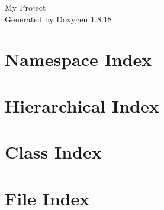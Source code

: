 \let\mypdfximage\pdfximage\def\pdfximage{\immediate\mypdfximage}\documentclass[twoside]{book}
\newcommand{\+}{\discretionary{\mbox{\scriptsize$\hookleftarrow$}}{}{}}
\newcommand{\clearemptydoublepage}{%
  \newpage{\pagestyle{empty}\cleardoublepage}%
}
\begin{document}
\hypersetup{pageanchor=false,
             bookmarksnumbered=true,
             pdfencoding=unicode
            }
\begin{titlepage}
\vspace*{7cm}
\begin{center}%
{\Large My Project }\\
\vspace*{1cm}
{\large Generated by Doxygen 1.8.18}\\
\end{center}
\end{titlepage}
\clearemptydoublepage
{}
\tableofcontents
\clearemptydoublepage
{}
\hypersetup{pageanchor=true}

\chapter{Namespace Index}

\chapter{Hierarchical Index}

\chapter{Class Index}

\chapter{File Index}

\end{document}
